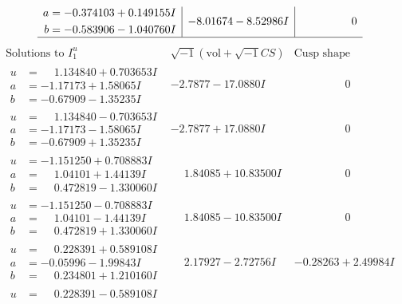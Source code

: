 \documentclass[1p]{elsarticle_modified}
\theoremstyle{definition}
\newcommand{\I}{\sqrt{-1}}
\begin{document}
$$\begin{array}{c|c|c}
\begin{aligned}
a &= -0.374103 + 0.149155 I \\
b &= -0.583906 - 1.040760 I\end{aligned}
 & -8.01674 - 8.52986 I & \phantom{-0.000000 } 0\\
 \hline 
 \end{array}$$\newpage$$\begin{array}{c|c|c}  
\text{Solutions to }I^u_{1}& \I (\text{vol} + \sqrt{-1}CS) & \text{Cusp shape}\\
 \hline 
\begin{aligned}
u &= \phantom{-}1.134840 + 0.703653 I \\
a &= -1.17173 + 1.58065 I \\
b &= -0.67909 - 1.35235 I\end{aligned}
 & -2.7877 - 17.0880 I & \phantom{-0.000000 } 0 \\ \hline\begin{aligned}
u &= \phantom{-}1.134840 - 0.703653 I \\
a &= -1.17173 - 1.58065 I \\
b &= -0.67909 + 1.35235 I\end{aligned}
 & -2.7877 + 17.0880 I & \phantom{-0.000000 } 0 \\ \hline\begin{aligned}
u &= -1.151250 + 0.708883 I \\
a &= \phantom{-}1.04101 + 1.44139 I \\
b &= \phantom{-}0.472819 - 1.330060 I\end{aligned}
 & \phantom{-}1.84085 + 10.83500 I & \phantom{-0.000000 } 0 \\ \hline\begin{aligned}
u &= -1.151250 - 0.708883 I \\
a &= \phantom{-}1.04101 - 1.44139 I \\
b &= \phantom{-}0.472819 + 1.330060 I\end{aligned}
 & \phantom{-}1.84085 - 10.83500 I & \phantom{-0.000000 } 0 \\ \hline\begin{aligned}
u &= \phantom{-}0.228391 + 0.589108 I \\
a &= -0.05996 - 1.99843 I \\
b &= \phantom{-}0.234801 + 1.210160 I\end{aligned}
 & \phantom{-}2.17927 - 2.72756 I & -0.28263 + 2.49984 I \\ \hline\begin{aligned}
u &= \phantom{-}0.228391 - 0.589108 I \\

\end{aligned}
\end{array}$$
\end{document}

